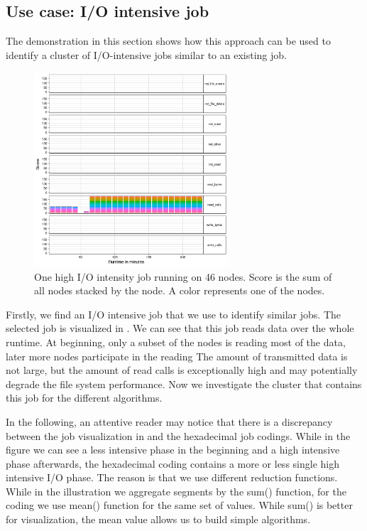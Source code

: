 \documentclass[]{llncs}
\begin{document}
\subsection{Use case: I/O intensive job}
The demonstration in this section shows how this approach can be used to identify a cluster of I/O-intensive jobs similar to an existing job.
\begin{figure}[h]
  \centering
  \includegraphics[width=2.84in,height=2.85in]{./media/image1.png}
  \caption{One high I/O intensity job running on 46 nodes. Score is the sum of all nodes stacked by the node. A color represents one of the nodes.}
  \label{fig:use_case}
\end{figure}
Firstly, we find an I/O intensive job that we use to identify similar jobs.
The selected job is visualized in .
We can see that this job reads data over the whole runtime.
At beginning, only a subset of the nodes is reading most of the data, later more nodes participate in the reading The amount of transmitted data is not large, but the amount of read calls is exceptionally high and may potentially degrade the file system performance.
Now we investigate the cluster that contains this job for the different algorithms.

In the following, an attentive reader may notice that there is a discrepancy between the job visualization in   and the hexadecimal job codings. 
While in the figure we can see a less intensive phase in the beginning and a high intensive phase afterwards, the hexadecimal coding contains a more or less single high intensive I/O phase. 
The reason is that we use different reduction functions. While in the illustration we aggregate segments by the sum() function, for the coding we use mean() function for the same set of values. 
While sum() is better for visualization, the mean value allows us to build simple algorithms.
\end{document}
